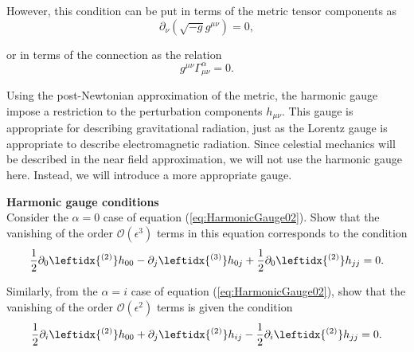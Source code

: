 However, this condition can be put in terms of the metric tensor components as
\begin{equation}
\partial_\nu \left( \sqrt{-g} g^{\mu \nu} \right) = 0,
\end{equation}

or in terms of the connection as the relation
\begin{equation}
g^{\mu \nu} \Gamma^\alpha_{\mu \nu} = 0. \label{eq:HarmonicGauge02}
\end{equation}

Using the post-Newtonian approximation of the metric, the harmonic gauge impose a restriction to the perturbation components $h_{\mu \nu}$. This gauge is appropriate for describing gravitational radiation, just as the Lorentz gauge is appropriate to describe electromagnetic radiation. Since celestial mechanics will be described in the near field approximation, we will not use the harmonic gauge here. Instead, we will introduce a more appropriate gauge.

\vspace{2cm}
\begin{exercise}
\textbf{Harmonic gauge conditions}\\
Consider the $\alpha=0$ case of equation (\ref{eq:HarmonicGauge02}). Show that the vanishing of the  order $\mathcal{O}(\epsilon^3)$ terms in this equation corresponds to the condition
\begin{equation}
\frac{1}{2} \partial_0  \leftidx{ ^{(2)}} h_{00} -  \partial_j  \leftidx{ ^{(3)}} h_{0j} + \frac{1}{2} \partial_0  \leftidx{ ^{(2)}} h_{jj} = 0. \label{eq:HarmonicCondition01}
\end{equation}

Similarly, from the $\alpha=i$ case of equation (\ref{eq:HarmonicGauge02}), show that the vanishing of  the order $\mathcal{O}(\epsilon^2)$ terms is given the condition
\begin{equation}
\frac{1}{2} \partial_i  \leftidx{ ^{(2)}} h_{00} +  \partial_j  \leftidx{ ^{(2)}} h_{ij} - \frac{1}{2} \partial_i  \leftidx{ ^{(2)}} h_{jj} = 0. \label{eq:HarmonicCondition02}
\end{equation}
\end{exercise}

